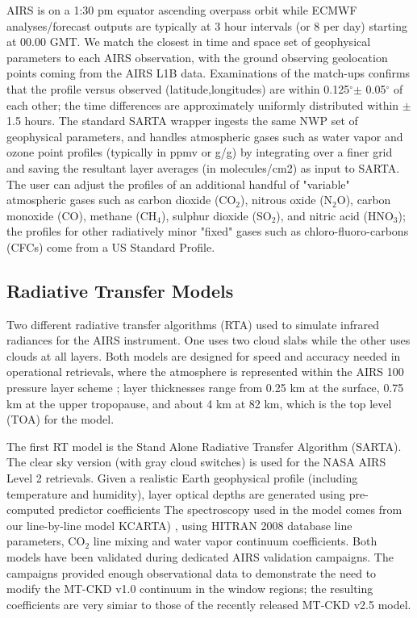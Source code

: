 \documentclass[agupp]{aguplus}              %
\newcommand{\ch}{CH$_4$\xspace}
\newcommand{\cd}{CO$_2$\xspace}
\newcommand{\nit}{N$_2$O\xspace}
\newcommand{\co}{CO\xspace}
\newcommand{\so}{SO$_2$\xspace}
\newcommand{\hno}{HNO$_3$\xspace}
\newcommand{\mydeg}{\mbox{$^\circ$}}
\begin{document}
\begin{article}
AIRS is on a 1:30 pm equator ascending overpass orbit while ECMWF
analyses/forecast outputs are typically at 3 hour intervals (or 8 per
day) starting at 00.00 GMT.  We match the closest in time and space
set of geophysical parameters to each AIRS observation, with the
ground observing geolocation points coming from the AIRS L1B
data. Examinations of the match-ups confirms that the profile versus
observed (latitude,longitudes) are within 0.125\mydeg $\pm$ 0.05\mydeg
of each other; the time differences are approximately uniformly
distributed within $\pm$ 1.5 hours. The standard SARTA wrapper ingests
the same NWP set of geophysical parameters, and handles atmospheric
gases such as water vapor and ozone point profiles (typically in ppmv
or g/g) by integrating over a finer grid and saving the resultant
layer averages (in molecules/cm2) as input to SARTA. The user can
adjust the profiles of an additional handful of "variable" atmospheric
gases such as carbon dioxide (\cd), nitrous oxide (\nit), carbon
monoxide (\co), methane (\ch), sulphur dioxide (\so), and nitric
acid (\hno); the profiles for other radiatively minor "fixed" gases
such as chloro-fluoro-carbons (CFCs) come from a US Standard Profile.

\subsection{Radiative Transfer Models}

Two different radiative transfer algorithms (RTA) used to simulate
infrared radiances for the AIRS instrument. One uses two cloud slabs
while the other uses clouds at all layers. Both models are designed
for speed and accuracy needed in operational retrievals, where the
atmosphere is represented within the AIRS 100 pressure layer scheme
\citep{str:02*2}; layer thicknesses range from 0.25 km at the surface,
0.75 km at the upper tropopause, and about 4 km at 82 km, which is the
top level (TOA) for the model.

The first RT model is the Stand Alone Radiative Transfer Algorithm
(SARTA). The clear sky version (with gray cloud switches) is used for
the NASA AIRS Level 2 retrievals. Given a realistic Earth geophysical
profile (including temperature and humidity), layer optical depths are
generated using pre-computed predictor coefficients
\citep{aum:02*2,str:02*2,str:06*1} The spectroscopy used in the model
comes from our line-by-line model \textsf{KCARTA}) \citep{mac:02*1},
using HITRAN 2008 database \citep{rot:04} line parameters, \cd line
mixing and water vapor continuum coefficients. Both models have been
validated during dedicated AIRS validation campaigns. The campaigns
provided enough observational data to demonstrate the need to modify
the MT-CKD v1.0 continuum \citep{clo:95*1,clo:05} in the window
regions; the resulting coefficients are very simiar to those of the
recently released MT-CKD v2.5 model. 


\end{article}
\end{document}
